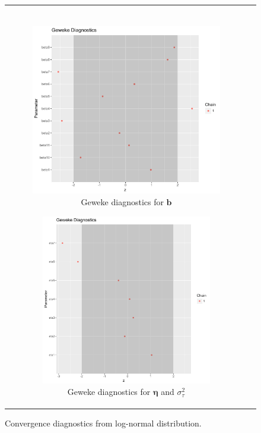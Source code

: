 \documentclass[ba]{imsart}
\numberwithin{equation}{section}
\theoremstyle{plain}
\begin{document}
\begin{figure}[H]
\begin{tabular}[t]{cc}
\begin{subfigure}[b]{0.495\textwidth}
				\end{subfigure}\\
				\begin{subfigure}[b]{0.495\textwidth}
					\caption{Geweke diagnostics for $\boldsymbol{b}$}
					\includegraphics[width=\textwidth]{img/betageweke.pdf}	
				\end{subfigure}
				\begin{subfigure}[b]{0.495\textwidth}
					\centering
					\caption{Geweke diagnostics for $\boldsymbol{\eta}$ and $\sigma^2_\tau$}
					\includegraphics[width=0.89\textwidth]{img/etageweke.pdf}
				\end{subfigure}
			\end{tabular}
			\caption {Convergence diagnostics from log-normal distribution.}
			\label{figure:convergencediag}
		\end{figure}
	\begin{supplement}
\label{suppA} 
\end{supplement}




\end{document}

